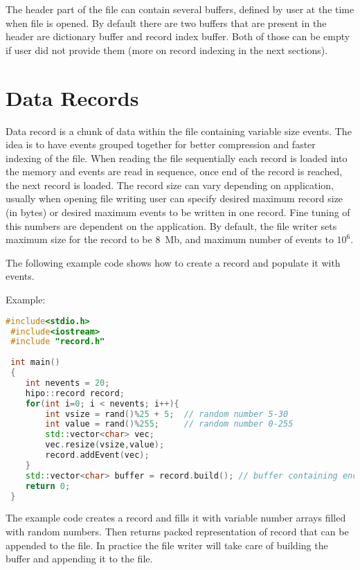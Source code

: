 \documentclass[12pt]{article}
\begin{document}
The header part of the file can contain several buffers, defined by user at the time 
when file is opened. By default there are two buffers that are present in the header
are dictionary buffer and record index buffer. Both of those can be empty if user did 
not provide them (more on record indexing in the next sections).

\section{Data Records}

Data record is a chunk of data within the file containing variable size events. The idea
is to have events grouped together for better compression and faster indexing of the file.
When reading the file sequentially each record is loaded into the memory and events are read
in sequence, once end of the record is reached, the next record is loaded. 
The record size can vary depending on application, usually when opening file writing user
can specify desired maximum record size (in bytes) or desired maximum events to be written 
in one record. Fine tuning of this numbers are dependent on the application. By default, the
file writer sets maximum size for the record to be 8~Mb, and maximum number of events
to $10^6$. 

The following example code shows how to create a record and populate it with events.

Example:

\begin{lstlisting}[language=C++,directivestyle={\color{black}}
                   emph={int,char,double,float,unsigned},
                   emphstyle={\color{blue}}]
 #include<stdio.h> 
 #include<iostream>
 #include "record.h"
 
 int main()
 {
    int nevents = 20;
    hipo::record record;
    for(int i=0; i < nevents; i++){ 
        int vsize = rand()%25 + 5;  // random number 5-30
        int value = rand()%255;     // random number 0-255
        std::vector<char> vec;
        vec.resize(vsize,value); 
        record.addEvent(vec);
    }
    std::vector<char> buffer = record.build(); // buffer containing encoded record
    return 0; 
 }
\end{lstlisting}

The example code creates a record and fills it with variable number arrays filled with random
numbers. Then returns packed representation of record that can be appended to the file.
In practice the file writer will take care of building the buffer and appending it to the file.
 
\end{document}
